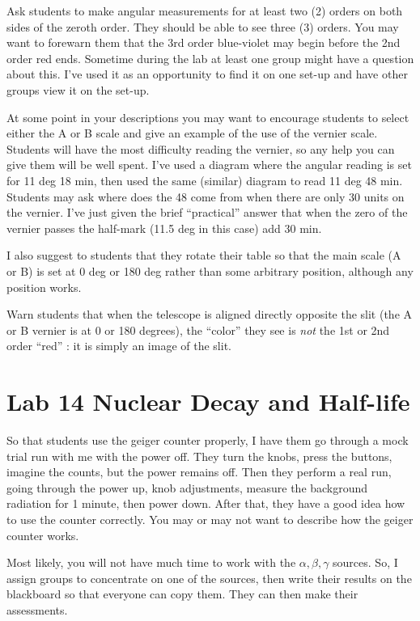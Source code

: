 Ask students to make angular measurements for at least two (2) orders on both sides of the zeroth order. They should be able to see three (3) orders. You may want to forewarn them that the 3rd order blue-violet may begin before the 2nd order red ends. Sometime during the lab at least one group might have a question about this. I've used it as an opportunity to find it on one set-up and have other groups view it on the set-up.

At some point in your descriptions you may want to encourage students to select either the A or B scale and give an example of the use of the vernier scale. Students will have the most difficulty reading the vernier, so any help you can give them will be well spent. I've used a diagram where the angular reading is set for 11 deg 18 min, then used the same (similar) diagram to read 11 deg 48 min. Students may ask where does the 48 come from when there are only 30 units on the vernier. I've just given the brief ``practical'' answer that when the zero of the vernier passes the half-mark (11.5 deg in this case) add 30 min.

I also suggest to students that they rotate their table so that the main scale (A or B) is set at 0 deg or 180 deg rather than some arbitrary position, although any position works.

Warn students that when the telescope is aligned directly opposite the slit (the A or B vernier is at 0 or 180 degrees), the ``color'' they see is \emph{not} the 1st or 2nd order ``red'' : it is simply an image of the slit.
\section{Lab 14 Nuclear Decay and Half-life}
So that students use the geiger counter properly, I have them go through a mock trial run with me with the power off. They turn the knobs, press the buttons, imagine the counts, but the power remains off. Then they perform a real run, going through the power up, knob adjustments, measure the background radiation for 1 minute, then power down. After that, they have a good idea how to use the counter correctly. You may or may not want to describe how the geiger counter works.

Most likely, you will not have much time to work with the $\alpha, \beta, \gamma$ sources. So, I assign groups to concentrate on one of the sources, then write their results on the blackboard so that everyone can copy them. They can then make their assessments.

